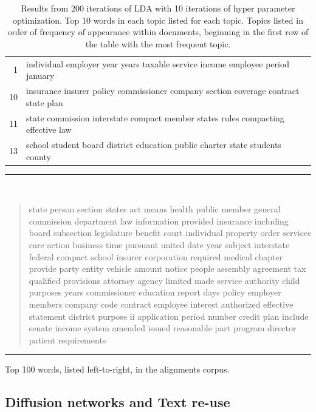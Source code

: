 \documentclass[12pt]{article} %
\begin{document}
\begin{table}[ht]
\begin{tabular}{rl}
  1 & individual employer year years taxable service income employee period january \\ 
  10 & insurance insurer policy commissioner company section coverage contract state plan \\ 
  11 & state commission interstate compact member states rules compacting effective law \\ 
  13 & school student board district education public charter state students county \\ 
   \hline
\end{tabular}
\caption{Results from 200 iterations of LDA with 10 iterations of hyper parameter optimization. Top 10 words in each topic listed for each topic. Topics listed in order of frequency of appearance within documents, beginning in the first row of the table with the most frequent topic.}
\label{tab:topics}
\end{table}

\begin{table}[ht]
\rule{\textwidth}{1pt} \\ \vspace{-1cm}
\begin{quotation}
\noindent state person section states act means health public member general commission department law information provided insurance including board subsection legislature benefit court individual property order services care action business time pursuant united date year subject interstate federal compact school insurer corporation required medical chapter provide party entity vehicle amount notice people assembly agreement tax qualified provisions attorney agency limited made service authority child purposes years commissioner education report days policy employer members company code contract employee interest authorized effective statement district purpose ii application period number credit plan include senate income system amended issued reasonable part program director patient requirements
\end{quotation} \vspace{-.5cm}
\rule{\textwidth}{1pt} \vspace{-.2cm}
\caption{Top 100 words, listed left-to-right, in the alignments corpus.}
\label{tab:top100words}
\end{table}




\subsection{Diffusion networks and Text re-use}
\end{document}
